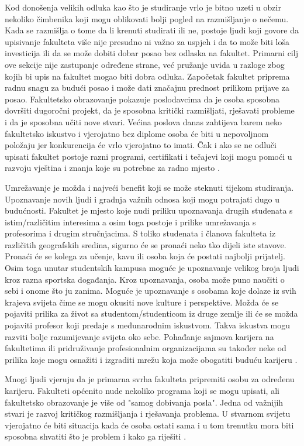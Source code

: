 \documentclass[]{foi}
\begin{document}
Kod donošenja velikih odluka kao što je studiranje vrlo je bitno uzeti u obzir nekoliko čimbenika koji mogu oblikovati bolji pogled na razmišljanje o nečemu. Kada se razmišlja o tome da li krenuti
studirati ili ne, postoje ljudi koji govore da upisivanje fakulteta više nije presudno ni važno za uspjeh i da to može biti loša investicija ili da se može dobiti dobar posao bez odlaska na fakultet.
Primarni cilj ove sekcije nije zastupanje određene strane, već pružanje uvida u razloge zbog kojih bi upis na fakultet mogao biti dobra odluka. Započetak fakultet priprema radnu snagu za budući posao i može
dati značajnu prednost prilikom prijave za posao. Fakultetsko obrazovanje pokazuje poslodavcima da je osoba sposobna dovršiti dugoročni projekt, da je sposobna kritički razmišljati,
rješavati probleme i da je sposobna učiti nove stvari. Većina poslova danas zahtijeva barem neko fakultetsko iskustvo i vjerojatno bez diplome osoba će biti u nepovoljnom položaju jer konkurencija
će vrlo vjerojatno to imati. Čak i ako se ne odluči upisati fakultet postoje razni programi, certifikati i tečajevi koji mogu pomoći u razvoju vještina i znanja koje su potrebne za radno mjesto
\cite{bisio2025college}.

Umrežavanje je možda i najveći benefit koji se može steknuti tijekom studiranja. Upoznavanje novih ljudi i gradnja važnih odnosa koji mogu potrajati dugo u budućnosti. Fakultet je mjesto koje nudi priliku upoznavanja drugih studenata s istim/različitim interesima a osim toga postoje i prilike umrežavanja s profesorima i drugim stručnjacima.
S toliko studenata i članova fakulteta iz različitih geografskih sredina, sigurno će se pronaći neko tko dijeli iste stavove. Pronaći će se kolega za učenje, kavu ili osoba koja će postati najbolji prijatelj.
Osim toga unutar studentskih kampusa moguće je upoznavanje velikog broja ljudi kroz razna sportska događanja. Kroz upoznavanja, osoba može puno naučiti o sebi i onome što ju zanima.
Moguće je upoznavanje s osobama koje dolaze iz svih krajeva svijeta čime se mogu okusiti nove kulture i perspektive. Možda će se pojaviti prilika za život sa studentom/studenticom iz druge zemlje ili 
će se možda pojaviti profesor koji predaje s međunarodnim iskustvom. Takva iskustva mogu razviti bolje razumijevanje svijeta oko sebe. Pohađanje sajmova karijera na fakultetima ili 
pridruživanje profesionalnim organizacijama su također neke od prilika koje mogu osnažiti i izgraditi mrežu koja može obogatiti buduću karijeru \cite{bisio2025college}.

Mnogi ljudi vjeruju da je primarna svrha fakulteta pripremiti osobu za određenu karijeru. Fakulteti općenito nude nekoliko programa koji se mogu upisati, ali fakultetsko obrazovanje
je više od "samog dobivanja posla". Jedna od važnijih stvari je razvoj kritičkog razmišljanja i rješavanja problema. U stvarnom svijetu vjerojatno će biti situacija kada će osoba ostati
sama i u tom trenutku mora biti sposobna shvatiti što je problem i kako ga riješiti \cite{bisio2025college}. 
\end{document}

